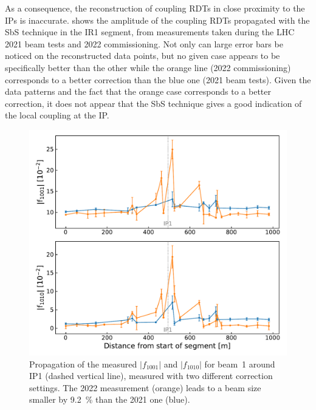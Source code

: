As a consequence, the reconstruction of coupling RDTs in close proximity to the IPs is inaccurate.
 shows the amplitude of the coupling RDTs propagated with the SbS technique in the IR\num{1} segment, from measurements taken during the LHC \num{2021} beam tests and \num{2022} commissioning.
Not only can large error bars be noticed on the reconstructed data points, but no given case appears to be specifically better than the other while the \textcolor{mplorange}{orange} line (\num{2022} commissioning) corresponds to a better correction than the \textcolor{mplblue}{blue} one (\num{2021} beam tests).
Given the data patterns and the fact that the orange case corresponds to a better correction, it does not appear that the SbS technique gives a good indication of the local coupling at the IP.

\begin{figure}[!htb]
    \centering
    \includegraphics*[width=\textwidth]{Figures/IR_Coupling_Correction/sbs_coupling_b1_ir1_compare_2021_2022_colin_delta_minus4.pdf}
    \caption{Propagation of the measured \(|f_{1001}|\) and \(|f_{1010}|\) for beam~\num{1} around IP\num{1} (dashed vertical line), measured with two different correction settings. The \num{2022} measurement (\textcolor{mplorange}{orange}) leads to a beam size smaller by \qty{9.2}{\percent} than the \num{2021} one (\textcolor{mplblue}{blue}).}
    \label{figure:beamtest_vs_2022_sbs_abs_f1001_ir1}
\end{figure}


